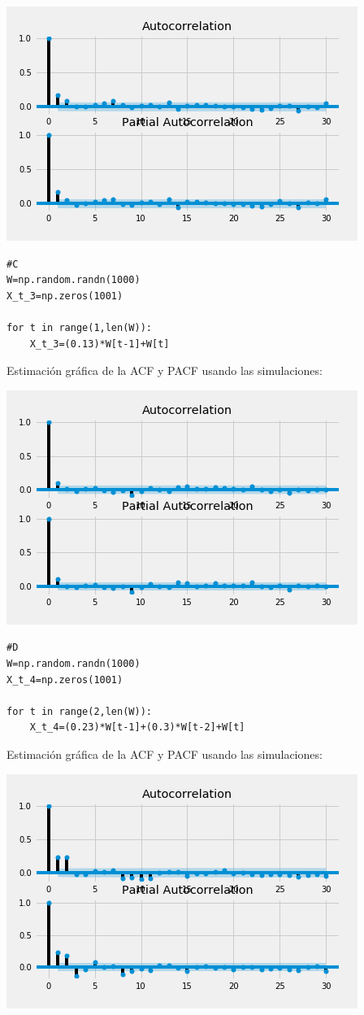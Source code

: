 \documentclass{article}
\begin{document}
\includegraphics{ACF_PACF_2.png}


\begin{verbatim}
#C
W=np.random.randn(1000)
X_t_3=np.zeros(1001)

for t in range(1,len(W)):
    X_t_3=(0.13)*W[t-1]+W[t]
\end{verbatim}    


Estimaci{ó}n gr{á}fica de la ACF y PACF usando las simulaciones:

\includegraphics{ACF_PACF_3.png}

\begin{verbatim}    
#D
W=np.random.randn(1000)
X_t_4=np.zeros(1001)

for t in range(2,len(W)):
    X_t_4=(0.23)*W[t-1]+(0.3)*W[t-2]+W[t]

\end{verbatim}


Estimaci{ó}n gr{á}fica de la ACF y PACF usando las simulaciones:

\includegraphics{ACF_PACF_4.png}
\end{document}
